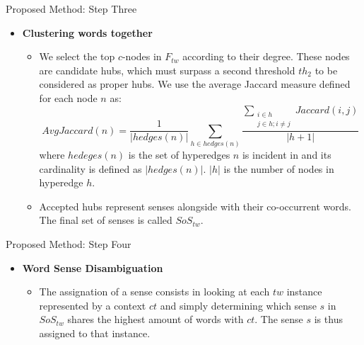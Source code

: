 \begin{frame}{Proposed Method: Step Three}
\begin{itemize}
	\item \textbf{Clustering words together}
	\begin{itemize}
		\item We select the top $c$-nodes in $F_{tw}$ according to their degree. These nodes are candidate hubs, which must surpass a second threshold $th_2$ to be considered as proper hubs. We use the average Jaccard measure defined for each node $n$ as: $$AvgJaccard(n)=\frac{1}{|hedges(n)|}\sum_{h\in hedges(n)}\frac{\sum_{\substack{i\in h\\j\in h;i\neq j}}Jaccard(i,j)}{|h + 1|}$$ 
		where $hedeges(n)$ is the set of hyperedges $n$ is incident in and its cardinality is defined as $|hedges(n)|$. $|h|$ is the number of nodes in hyperedge $h$. 
		\item Accepted hubs represent senses alongside with their co-occurrent words. The final set of senses is called $SoS_{tw}$.
		
		
		
	\end{itemize}

\end{itemize}
\end{frame}


\begin{frame}{Proposed Method: Step Four}

\begin{itemize}
	\item\textbf{ Word Sense Disambiguation}
	\begin{itemize}
		\item The assignation of a sense consists in looking at each $tw$ instance represented by a context $ct$ and simply determining which sense $s$ in $SoS_{tw}$ shares the highest amount of words with $ct$. The sense $s$ is thus assigned to that instance. 
	\end{itemize}

\end{itemize}
\end{frame}


